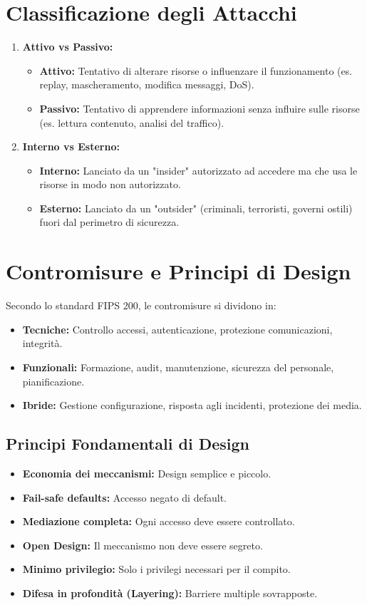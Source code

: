 \documentclass{article}
\begin{document}
\section{Classificazione degli Attacchi}
\begin{enumerate}
    \item \textbf{Attivo vs Passivo:}
    \begin{itemize}
        \item \textbf{Attivo:} Tentativo di alterare risorse o influenzare il funzionamento (es. replay, mascheramento, modifica messaggi, DoS).
        \item \textbf{Passivo:} Tentativo di apprendere informazioni senza influire sulle risorse (es. lettura contenuto, analisi del traffico).
    \end{itemize}
    \item \textbf{Interno vs Esterno:}
    \begin{itemize}
        \item \textbf{Interno:} Lanciato da un "insider" autorizzato ad accedere ma che usa le risorse in modo non autorizzato.
        \item \textbf{Esterno:} Lanciato da un "outsider" (criminali, terroristi, governi ostili) fuori dal perimetro di sicurezza.
    \end{itemize}
\end{enumerate}

\section{Contromisure e Principi di Design}
Secondo lo standard FIPS 200, le contromisure si dividono in:
\begin{itemize}
    \item \textbf{Tecniche:} Controllo accessi, autenticazione, protezione comunicazioni, integrità.
    \item \textbf{Funzionali:} Formazione, audit, manutenzione, sicurezza del personale, pianificazione.
    \item \textbf{Ibride:} Gestione configurazione, risposta agli incidenti, protezione dei media.
\end{itemize}

\subsection*{Principi Fondamentali di Design}
\begin{itemize}
    \item \textbf{Economia dei meccanismi:} Design semplice e piccolo.
    \item \textbf{Fail-safe defaults:} Accesso negato di default.
    \item \textbf{Mediazione completa:} Ogni accesso deve essere controllato.
    \item \textbf{Open Design:} Il meccanismo non deve essere segreto.
    \item \textbf{Minimo privilegio:} Solo i privilegi necessari per il compito.
    \item \textbf{Difesa in profondità (Layering):} Barriere multiple sovrapposte.
\end{itemize}
\end{document}
